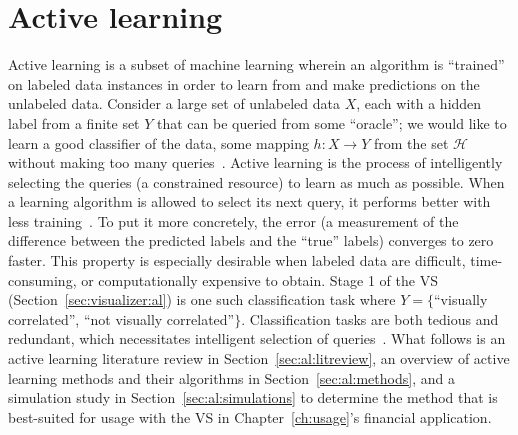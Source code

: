 \chapter{Active learning \label{ch:al}}

Active learning is a subset of machine learning wherein an algorithm is 
``trained'' on labeled data instances in order to learn from and make 
predictions on the unlabeled data.  
Consider a large set of unlabeled data $X$, each with a 
hidden label from a finite set $Y$ that can be queried from some 
``oracle''; we would like to learn a good classifier of the data, some mapping 
$h: X \rightarrow Y$ from the set $\mathcal{H}$ without making too many 
queries~\cite{dasgupta2011}. Active learning is the process of intelligently 
selecting the queries (a constrained resource) to learn as much as possible. 
When a learning algorithm is allowed to select its next query, it performs 
better with less training~\cite{settles2010}. To put it more concretely, the 
error (a measurement of the difference between the predicted labels and the 
``true'' labels) converges to zero faster. This property is especially 
desirable when labeled data are difficult, time-consuming, or computationally 
expensive to obtain. Stage 1 of the VS (Section~\ref{sec:visualizer:al}) is 
one such classification task where $Y=\{$``visually correlated'', ``not 
visually correlated''$\}$. 
Classification tasks are both tedious and redundant, which 
necessitates intelligent selection of queries~\cite{settles2010}. What follows 
is an active learning literature review in Section~\ref{sec:al:litreview}, an 
overview of active learning methods and their algorithms in 
Section~\ref{sec:al:methods}, and a simulation study in 
Section~\ref{sec:al:simulations} to determine the method that is best-suited 
for usage with the VS in Chapter~\ref{ch:usage}'s financial application.



